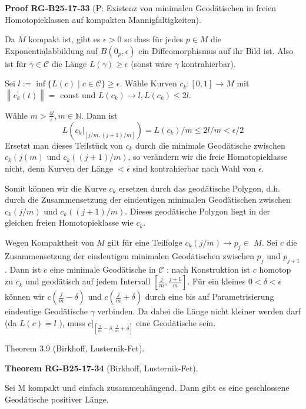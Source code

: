 \documentclass[10pt, letterpaper]{article}
\newcommand{\CustomHeading}[3]{%
  \par\medskip\noindent%
  \textbf{#1 #2} \textnormal{(#3)}.\enskip%
}
\newenvironment{THEO}[2]{\begin{unitbox}\CustomHeading{Theorem}{#1}{#2}}{\end{unitbox}}
\newenvironment{PROOF}[2]{\begin{unitbox}\CustomHeading{Proof}{#1}{#2}}{\end{unitbox}}
\begin{document}
\begin{PROOF}{RG-B25-17-33}{P: Existenz von minimalen Geodätischen in freien Homotopieklassen auf kompakten Mannigfaltigkeiten}
Da $M$ kompakt ist, gibt es $\epsilon>0$ so dass für jedes $p \in M$ die Exponentialabbildung auf $B\left(0_{p}, \epsilon\right)$ ein Diffeomorphismus auf ihr Bild ist. Also ist für $\gamma \in \mathcal{C}$ die Länge $L(\gamma) \geq \epsilon$ (sonst wäre $\gamma$ kontrahierbar).

Sei $l:=\inf \{L(c) \mid c \in \mathcal{C}\} \geq \epsilon$. Wähle Kurven $c_{k}:[0,1] \rightarrow M$ mit $\left\|c_{k}^{\prime}(t)\right\|=$ const und $L\left(c_{k}\right) \rightarrow l, L\left(c_{k}\right) \leq 2 l$.

Wähle $m>\frac{4 l}{\epsilon}, m \in \mathbb{N}$. Dann ist 
$$L\left(\left.c_{k}\right|_{[j / m,(j+1) / m]}\right)=L\left(c_{k}\right) / m \leq 2 l / m<\epsilon / 2$$ 
Ersetzt man dieses Teilstück von $c_{k}$ durch die minimale Geodätische zwischen $c_{k}\left(j(m)\right.$ und $c_{k}((j+1) / m)$, so verändern wir die freie Homotopieklasse nicht, denn Kurven der Länge $<\epsilon$ sind kontrahierbar nach Wahl von $\epsilon$.

Somit können wir die Kurve $c_{k}$ ersetzen durch das geodätische Polygon, d.h. durch die Zusammensetzung der eindeutigen minimalen Geodätischen zwischen $c_{k}(j / m)$ und $c_{k}((j+1) / m)$. Dieses geodätische Polygon liegt in der gleichen freien Homotopieklasse wie $c_{k}$.

Wegen Kompaktheit von $M$ gilt für eine Teilfolge $c_{k}(j / m) \rightarrow p_{j} \in$ $M$. Sei $c$ die Zusammensetzung der eindeutigen minimalen Geodätischen zwischen $p_{j}$ und $p_{j+1}$. Dann ist $c$ eine minimale Geodätische in $\mathcal{C}$ : nach Konstruktion ist $c$ homotop zu $c_{k}$ und geodätisch auf jedem Intervall $\left[\frac{j}{m}, \frac{j+1}{m}\right]$. Für ein kleines $0<\delta<\epsilon$ können wir $c\left(\frac{j}{m}-\delta\right)$ und $c\left(\frac{j}{m}+\delta\right)$ durch eine bis auf Parametrisierung eindeutige Geodätische $\gamma$ verbinden. Da dabei die Länge nicht kleiner werden darf (da $L(c)=l$ ), muss $\left.c\right|_{\left[\frac{j}{m}-\delta, \frac{j}{m}+\delta\right]}$ eine Geodätische sein.
\end{PROOF}



Theorem 3.9 (Birkhoff, Lusternik-Fet). 

\begin{THEO}{RG-B25-17-34}{Birkhoff, Lusternik-Fet}
Sei M kompakt und einfach zusammenhängend. Dann gibt es eine geschlossene Geodätische positiver Länge.
\end{THEO}
\end{document}
